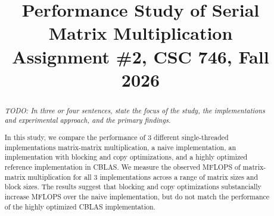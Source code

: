 \documentclass[11pt,final,conference]{IEEEtran}
\begin{document}
\thispagestyle{plain}
\pagestyle{plain}

\title{Performance Study of Serial Matrix Multiplication\\
Assignment \#2, CSC 746, Fall 2026}

\author{
}

\maketitle

\begin{abstract}
\textit{TODO: In three or four sentences, state the focus of the study, the
implementations and experimental approach, and the primary findings.}

In this study, we compare the performance of 3 different single-threaded implementations matrix-matrix multiplication, a naive implementation, an implementation with blocking and copy optimizations, and a highly optimized reference implementation in CBLAS. We measure the observed MFLOPS of matrix-matrix multiplication for all 3 implementations across a range of matrix sizes and block sizes. The results suggest that blocking and copy optimizations substancially increase MFLOPS over the naive implementation, but do not match the performance of the highly optimized CBLAS implementation. 
\end{abstract}




\end{document}
